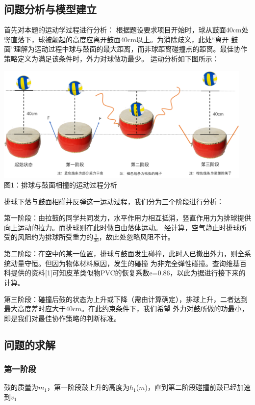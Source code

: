 \documentclass[UTF8]{article}
\begin{document}
\subsection{问题分析与模型建立}
首先对本题的运动学过程进行分析：
根据题设要求项目开始时，球从鼓面40cm处竖直落下，球被颠起的高度应离开鼓面40cm以上。为消除歧义，此处“离开
鼓面”理解为运动过程中球与鼓面的最大距离，而非球距离碰撞点的距离。最佳协作策略定义为满足该条件时，外力对球做功最少。
运动分析如下图所示：
\begin{center}
    \includegraphics[width=0.95\textwidth]{figure1.png}\\ 
    图1：排球与鼓面相撞的运动过程分析  
\end{center}

排球下落与鼓面相碰并反弹这一运动过程，我们分为三个阶段进行分析：

第一阶段：由拉鼓的同学共同发力，水平作用力相互抵消，竖直作用力为排球提供向上运动的拉力。而排球则在此时做自由落体运动。
经计算，空气静止时排球所受的风阻约为排球所受重力的$\frac{1}{30}$，故此处忽略风阻不计。

第二阶段：在空中的某一位置，排球与鼓面发生碰撞，此时人已撤出外力，则全系统动量守恒。但因为物体材料原因，发生的碰撞
为非完全弹性碰撞。查询维基百科提供的资料[1]可知皮革类似物PVC的恢复系数e=0.86，以此为据进行接下来的计算。

第三阶段：碰撞后鼓的状态为上升或下降（需由计算确定），排球上升，二者达到最大高度差时应大于40cm。在此约束条件下，我们希望
外力对鼓所做的功最小，即是我们对最佳协作策略的判断标准。

\subsection{问题的求解}
\subsubsection{第一阶段}
鼓的质量为$m_1$，第一阶段鼓上升的高度为$h_1$($m$)，直到第二阶段碰撞前鼓已经加速到$v_1$
\end{document}
